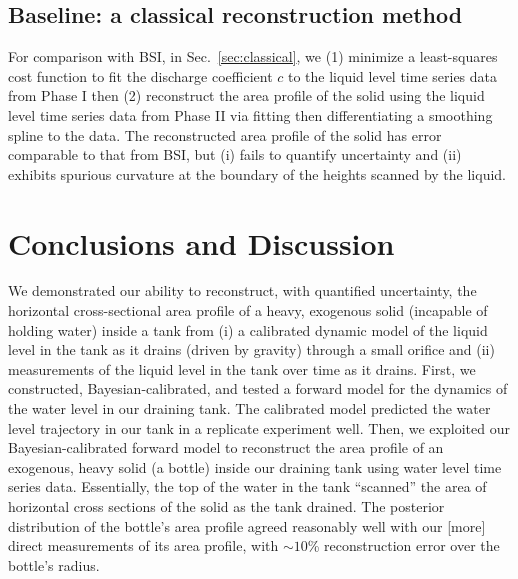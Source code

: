 \documentclass[a4paper,fleqn]{cas-dc}
\begin{document}
\subsection{Baseline: a classical reconstruction method}
For comparison with BSI, in Sec.~\ref{sec:classical}, we (1) minimize a least-squares cost function to fit the discharge coefficient $c$ to the liquid level time series data from Phase I then (2) reconstruct the area profile of the solid using the liquid level time series data from Phase II via fitting then differentiating a smoothing spline to the data. The reconstructed area profile of the solid has error comparable to that from BSI, but (i) fails to quantify uncertainty and (ii) exhibits spurious curvature at the boundary of the heights scanned by the liquid.


\section{Conclusions and Discussion}
We demonstrated our ability to reconstruct, with quantified uncertainty, the horizontal cross-sectional area profile of a heavy, exogenous solid (incapable of holding water) inside a tank from (i) a calibrated dynamic model of the liquid level in the tank as it drains (driven by gravity) through a small orifice and (ii) measurements of the liquid level in the tank over time as it drains.
First, we constructed, Bayesian-calibrated, and tested a forward model for the dynamics of the water level in our draining tank.
The calibrated model predicted the water level trajectory in our tank in a replicate experiment well.
Then, we exploited our Bayesian-calibrated forward model to reconstruct the area profile of an exogenous, heavy solid (a bottle) inside our draining tank using water level time series data. 
Essentially, the top of the water in the tank ``scanned'' the area of horizontal cross sections of the solid as the tank drained. 
The posterior distribution of the bottle's area profile agreed reasonably well with our [more] direct measurements of its area profile, with $\sim 10$\% reconstruction error over the bottle's radius. 
\end{document}
